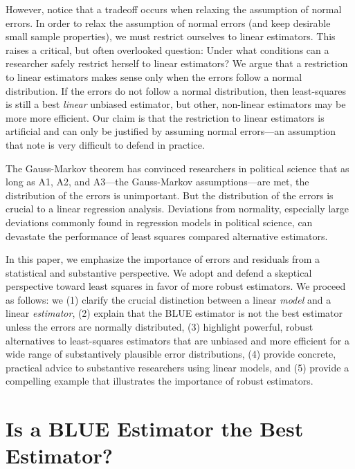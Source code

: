 \documentclass[12pt]{article}
\begin{document}
However, notice that a tradeoff occurs when relaxing the assumption of normal errors. 
In order to relax the assumption of normal errors (and keep desirable small sample properties), we must restrict ourselves to linear estimators. 
This raises a critical, but often overlooked question: Under what conditions can a researcher safely restrict herself to linear estimators? 
We argue that a restriction to linear estimators makes sense only when the errors follow a normal distribution. 
If the errors do not follow a normal distribution, then least-squares is still a best \textit{linear} unbiased estimator, but other, non-linear estimators may be more more efficient.
Our claim is that the restriction to linear estimators is artificial and can only be justified by assuming normal errors---an assumption that \cite{BerryFeldman1985} note is very difficult to defend in practice.

The Gauss-Markov theorem has convinced researchers in political science that as long as A1, A2, and A3---the Gauss-Markov assumptions---are met, the distribution of the errors is unimportant. 
But the distribution of the errors is crucial to a linear regression analysis.
Deviations from normality, especially large deviations commonly found in regression models in political science, can devastate the performance of least squares compared alternative estimators. 

In this paper, we emphasize the importance of errors and residuals from a statistical and substantive perspective. We adopt and defend a skeptical perspective toward least squares in favor of more robust estimators. We proceed as follows: we (1) clarify the crucial distinction between a linear \textit{model} and a linear \textit{estimator}, (2) explain that the BLUE estimator is not the best estimator unless the errors are normally distributed, (3) highlight powerful, robust alternatives to least-squares estimators that are unbiased and more efficient for a wide range of substantively plausible error distributions, (4) provide concrete, practical advice to substantive researchers using linear models, and (5) provide a compelling example that illustrates the importance of robust estimators.

\section*{Is a BLUE Estimator the Best Estimator?}
\end{document}
